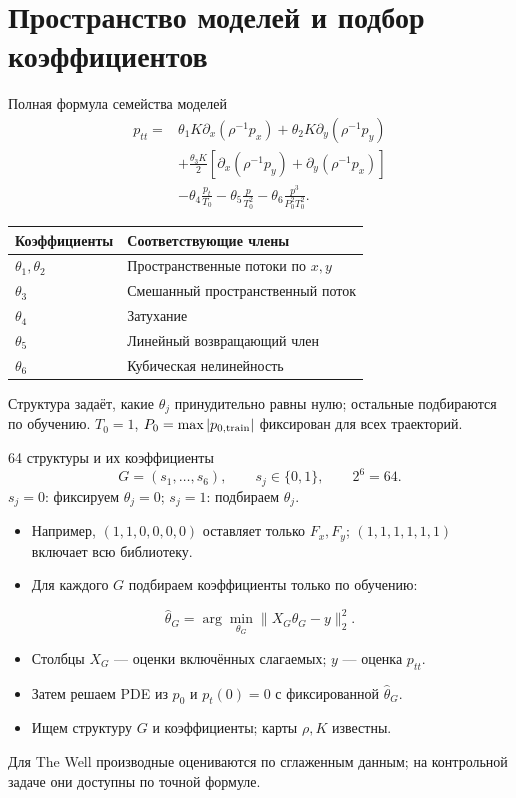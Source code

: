 \documentclass{beamer}
\begin{document}
\section{Пространство моделей и подбор коэффициентов}
\begin{frame}{Полная формула семейства моделей}\small
\[
\begin{aligned}
p_{tt}={}&\theta_1K\partial_x(\rho^{-1}p_x)
+\theta_2K\partial_y(\rho^{-1}p_y)\\
&+\frac{\theta_3K}{2}
\left[\partial_x(\rho^{-1}p_y)+\partial_y(\rho^{-1}p_x)\right]\\
&-\theta_4\frac{p_t}{T_0}-\theta_5\frac{p}{T_0^2}
-\theta_6\frac{p^3}{P_0^2T_0^2}.
\end{aligned}
\]
\renewcommand{\arraystretch}{1.2}
\begin{tabular}{@{}ll@{}}\toprule
Коэффициенты & Соответствующие члены\\\midrule
$\theta_1,\theta_2$ & Пространственные потоки по $x,y$\\
$\theta_3$ & Смешанный пространственный поток\\
$\theta_4$ & Затухание\\
$\theta_5$ & Линейный возвращающий член\\
$\theta_6$ & Кубическая нелинейность\\\bottomrule
\end{tabular}\par\medskip
\footnotesize Структура задаёт, какие $\theta_j$ принудительно равны нулю;
остальные подбираются по обучению.
$T_0=1$, $P_0=\max|p_{0,\rm train}|$ фиксирован для всех траекторий.
\end{frame}

\begin{frame}{64 структуры и их коэффициенты}\small
\[G=(s_1,\ldots,s_6),\qquad s_j\in\{0,1\},\qquad 2^6=64.\]
$s_j=0$: фиксируем $\theta_j=0$; $s_j=1$: подбираем $\theta_j$.
\begin{itemize}
\item Например, $(1,1,0,0,0,0)$ оставляет только $F_x,F_y$;
$(1,1,1,1,1,1)$ включает всю библиотеку.
\item Для каждого $G$ подбираем коэффициенты только по обучению:
\end{itemize}
\[\widehat\theta_G=\arg\min_{\theta_G}\|X_G\theta_G-y\|_2^2.\]
\begin{itemize}
\item Столбцы $X_G$ --- оценки включённых слагаемых; $y$ --- оценка $p_{tt}$.
\item Затем решаем PDE из $p_0$ и $p_t(0)=0$ с фиксированной $\widehat\theta_G$.
\item Ищем структуру $G$ и коэффициенты; карты $\rho,K$ известны.
\end{itemize}
\footnotesize Для The Well производные оцениваются по сглаженным данным;
на контрольной задаче они доступны по точной формуле.
\end{frame}
\end{document}
